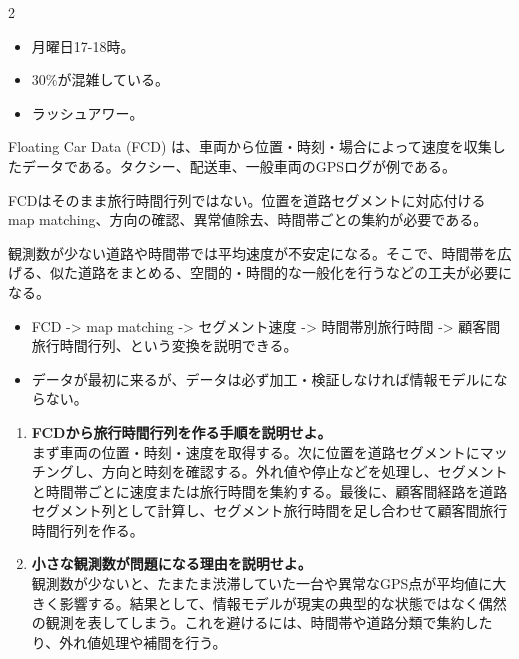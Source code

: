 \clearpage
{}
\begin{multicols}{2}\footnotesize\raggedcolumns
{}
\begin{itemize}
\item 月曜日17-18時。
\item 30\%が混雑している。
\item ラッシュアワー。
\end{itemize}
Floating Car Data (FCD) は、車両から位置・時刻・場合によって速度を収集したデータである。タクシー、配送車、一般車両のGPSログが例である。\par

FCDはそのまま旅行時間行列ではない。位置を道路セグメントに対応付ける map matching、方向の確認、異常値除去、時間帯ごとの集約が必要である。\par

観測数が少ない道路や時間帯では平均速度が不安定になる。そこで、時間帯を広げる、似た道路をまとめる、空間的・時間的な一般化を行うなどの工夫が必要になる。\par
{}
\begin{itemize}
\item FCD -> map matching -> セグメント速度 -> 時間帯別旅行時間 -> 顧客間旅行時間行列、という変換を説明できる。
\item データが最初に来るが、データは必ず加工・検証しなければ情報モデルにならない。
\end{itemize}
\begin{enumerate}
\item \textbf{FCDから旅行時間行列を作る手順を説明せよ。}\\まず車両の位置・時刻・速度を取得する。次に位置を道路セグメントにマッチングし、方向と時刻を確認する。外れ値や停止などを処理し、セグメントと時間帯ごとに速度または旅行時間を集約する。最後に、顧客間経路を道路セグメント列として計算し、セグメント旅行時間を足し合わせて顧客間旅行時間行列を作る。
\item \textbf{小さな観測数が問題になる理由を説明せよ。}\\観測数が少ないと、たまたま渋滞していた一台や異常なGPS点が平均値に大きく影響する。結果として、情報モデルが現実の典型的な状態ではなく偶然の観測を表してしまう。これを避けるには、時間帯や道路分類で集約したり、外れ値処理や補間を行う。
\end{enumerate}
\end{multicols}

